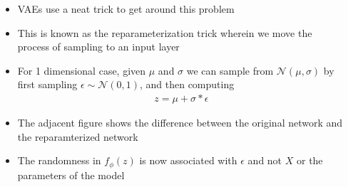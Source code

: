 \begin{frame}
	\begin{columns}
		\begin{overlayarea}{\textwidth}{\textheight}
		\vspace{1cm}
		\only<1-3>{}
		\only<4->{}
		\end{overlayarea}
		\begin{overlayarea}{\textwidth}{\textheight}
			\begin{itemize}[<+->]\justifying
				\item VAEs use a neat trick to get around this problem
				\item This is known as the reparameterization trick wherein we move the process of sampling to an input layer
				\item For 1 dimensional case, given $\mu$ and $\sigma$ we can sample from $\mathcal{N} (\mu, \sigma)$ by first sampling $\epsilon \sim \mathcal{N} (0, 1)$, and then computing 
				\begin{align*}
				z = \mu + \sigma * \epsilon
				\end{align*}
				\item The adjacent figure shows the difference between the original network and the reparamterized network
				\item The randomness in $f_\phi(z)$ is now associated with $\epsilon$ and not $X$ or the parameters of the model
			\end{itemize}
		\end{overlayarea}
	\end{columns}
\end{frame}

